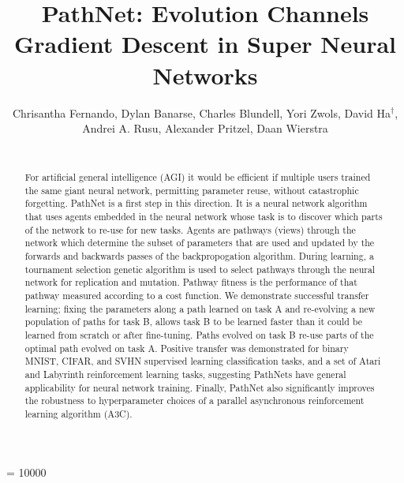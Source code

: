 \documentclass{sig-alternate-05-2015}
\begin{document}
\widowpenalty = 10000
\title{PathNet: Evolution Channels Gradient Descent in Super Neural Networks}
\author{
\alignauthor
Chrisantha Fernando, Dylan Banarse, Charles Blundell, Yori Zwols, David Ha$^\dagger$, Andrei A. Rusu, Alexander Pritzel, Daan Wierstra\\
       \\
}

\maketitle
\begin{abstract}
For artificial general intelligence (AGI) it would be efficient if multiple users trained the same giant neural network, permitting parameter reuse, without catastrophic forgetting. PathNet is a first step in this direction. It is a neural network algorithm that uses agents embedded in the neural network whose task is to discover which parts of the network to re-use for new tasks. Agents are pathways (views) through the network which determine the subset of parameters that are used and updated by the forwards and backwards passes of the backpropogation algorithm. During learning, a tournament selection genetic algorithm is used to select pathways through the neural network for replication and mutation. Pathway fitness is the performance of that pathway measured according to a cost function. We demonstrate successful transfer learning; fixing the parameters along a path learned on task A and re-evolving a new population of paths for task B, allows task B to be learned faster than it could be learned from scratch or after fine-tuning. Paths evolved on task B re-use parts of the optimal path evolved on task A. Positive transfer was demonstrated for binary MNIST, CIFAR, and SVHN supervised learning classification tasks, and a set of Atari and Labyrinth reinforcement learning tasks, suggesting PathNets have general applicability for neural network training. Finally, PathNet also significantly improves the robustness to hyperparameter choices of a parallel asynchronous reinforcement learning algorithm (A3C). \end{abstract}



\printccsdesc



\end{document}
